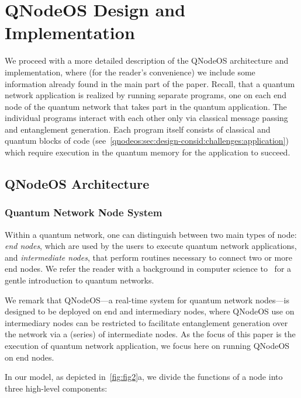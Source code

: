 \section{QNodeOS Design and Implementation}
\label{qnodeos:sec:design}

We proceed with a more detailed description of the \ac{QNodeOS} architecture and implementation, where (for the reader's convenience) we include some information already found in the main part of the paper. Recall, that a quantum network application is realized by running separate programs, one on each end node of the quantum network that takes part in the quantum application. The individual programs interact with each other only via classical message passing and entanglement generation. Each program itself consists of classical and quantum blocks of code (see~\cref{qnodeos:sec:design-consid:challenges:application}) which require execution in the quantum memory for the application to succeed.

\subsection{QNodeOS Architecture}
\label{qnodeos:sec:appendix-arch}

\subsubsection{Quantum Network Node System}
\label{qnodeos:sec:appendix-arch-node_system}

Within a quantum network, one can distinguish between two main types of node: \emph{end nodes}, which are used by the users to execute quantum network applications, and \emph{intermediate nodes}, that perform routines necessary to connect two or more end nodes. We refer the reader with a background in computer science to~\cite{vanMeter_book} for a gentle introduction to quantum networks. 

We remark that \ac{QNodeOS}---a real-time system for quantum network nodes---is designed to be deployed on end and intermediary nodes, where \ac{QNodeOS} use on intermediary nodes can be restricted to facilitate entanglement generation over the network via a (series) of intermediate nodes. As the focus of this paper is the execution of quantum network application, we focus here on running \ac{QNodeOS} on end nodes.

In our model, as depicted in~\cref{fig:fig2}a, we divide the functions of a node into three high-level components:

